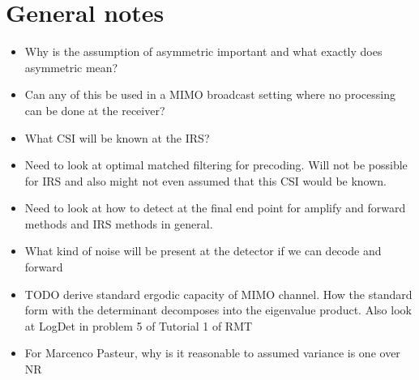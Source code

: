 \documentclass[12pt,a4paper]{article}
\begin{document}
\section{General notes}
\begin{itemize}
\item Why is the assumption of asymmetric important and what exactly does asymmetric mean?
\item Can any of this be used in a MIMO broadcast setting where no processing can be done at the receiver?
\item What CSI will be known at the IRS?
\item Need to look at optimal matched filtering for precoding. Will not be possible for IRS and also might not even assumed that this CSI would be known.
\item Need to look at how to detect at the final end point for amplify and forward methods and IRS methods in general.
\item What kind of noise will be present at the detector if we can decode and forward
\item TODO derive standard ergodic capacity of MIMO channel. How the standard form with the determinant decomposes into the eigenvalue product. Also look at LogDet in problem 5 of Tutorial 1 of RMT
\item For Marcenco Pasteur, why is it reasonable to assumed variance is one over NR
\end{itemize}



\end{document}
